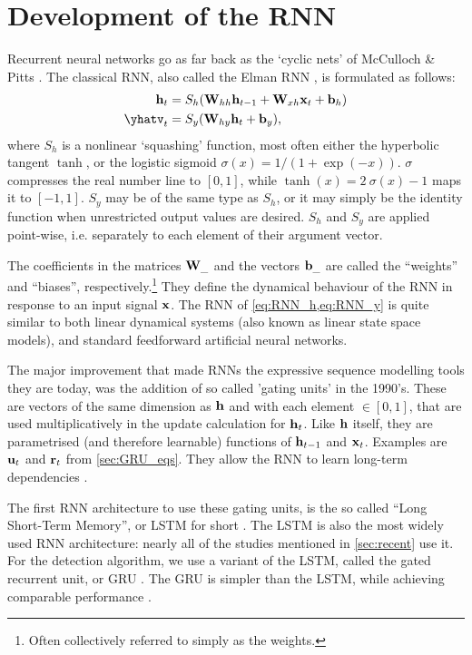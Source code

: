 \documentclass[Master_Thesis.tex]{subfiles}
\begin{document}
\section{Development of the RNN}
\label{sec:development}

Recurrent neural networks go as far back as the `cyclic nets' of McCulloch \& Pitts \cite{McCulloch1943}. The classical RNN, also called the Elman RNN \cite{Elman1988}, is formulated as follows:
\begin{align}
\h_t     &=  S_h( \W_{hh} \h\prev 
	       			+ \W_{xh} \x_t + \bias_h)   \label{eq:RNN_h} \\
\yhatv_t &=  S_y( \W_{hy} \h_t + \bias_y),      \label{eq:RNN_y}
\end{align}
where $S_h$ is a nonlinear `squashing' function, most often either the hyperbolic tangent $\tanh$, or the logistic sigmoid $\sigma(x) = 1 / (1 + \exp(-x))$. $\sigma$ compresses the real number line to $[0, 1]$, while $\tanh(x) = 2\ \sigma(x) - 1$ maps it to $[-1, 1]$. $S_y$ may be of the same type as $S_h$, or it may simply be the identity function when unrestricted output values are desired. $S_h$ and $S_y$ are applied point-wise, i.e. separately to each element of their argument vector.

The coefficients in the matrices $\vb{W}_\_$ and the vectors $\vb{b}_\_$ are called the ``weights'' and ``biases'', respectively.\footnote{Often collectively referred to simply as the weights.} They define the dynamical behaviour of the RNN in response to an input signal $\vb{x}$. The RNN of \cref{eq:RNN_h,eq:RNN_y} is quite similar to both linear dynamical systems (also known as linear state space models), and standard feedforward artificial neural networks. %

The major improvement that made RNNs the expressive sequence modelling tools they are today, was the addition of so called 'gating units' in the 1990's. These are vectors of the same dimension as $\vb{h}$ and with each element $\in [0, 1]$, that are used multiplicatively in the update calculation for $\vb{h}_t$. Like $\vb{h}$ itself, they are parametrised (and therefore learnable) functions of $\vb{h}_{t-1}$ and $\vb{x}_t$. Examples are $\vb{u}_t$ and $\vb{r}_t$ from \cref{sec:GRU_eqs}. They allow the RNN to learn long-term dependencies \cite{LeCun2015}.

The first RNN architecture to use these gating units, is the so called ``Long Short-Term Memory'', or LSTM for short \cite{Hochreiter1997}. The LSTM is also the most widely used RNN architecture: nearly all of the studies mentioned in \cref{sec:recent} use it. For the \swr{} detection algorithm, we use a variant of the LSTM, called the gated recurrent unit, or GRU \cite{Cho2014}. The GRU is simpler than the LSTM, while achieving comparable performance \cite{Chung2014}.
\end{document}
